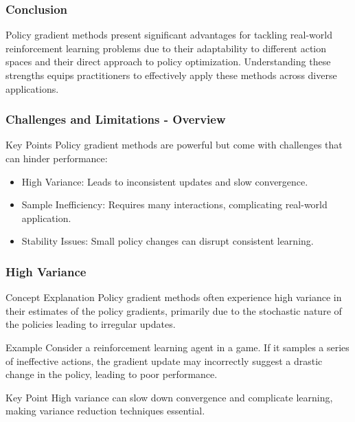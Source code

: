 \documentclass[aspectratio=169]{beamer}
\begin{document}
\begin{frame}[fragile]
    \frametitle{Conclusion}
    Policy gradient methods present significant advantages for tackling real-world reinforcement learning problems due to their adaptability to different action spaces and their direct approach to policy optimization. Understanding these strengths equips practitioners to effectively apply these methods across diverse applications.
\end{frame}

\begin{frame}[fragile]
    \frametitle{Challenges and Limitations - Overview}
    \begin{block}{Key Points}
        Policy gradient methods are powerful but come with challenges that can hinder performance:
        \begin{itemize}
            \item High Variance: Leads to inconsistent updates and slow convergence.
            \item Sample Inefficiency: Requires many interactions, complicating real-world application.
            \item Stability Issues: Small policy changes can disrupt consistent learning.
        \end{itemize}
    \end{block}
\end{frame}

\begin{frame}[fragile]
    \frametitle{High Variance}
    \begin{block}{Concept Explanation}
        Policy gradient methods often experience high variance in their estimates of the policy gradients, primarily due to the stochastic nature of the policies leading to irregular updates.
    \end{block}

    \begin{block}{Example}
        Consider a reinforcement learning agent in a game. If it samples a series of ineffective actions, the gradient update may incorrectly suggest a drastic change in the policy, leading to poor performance.
    \end{block}

    \begin{block}{Key Point}
        High variance can slow down convergence and complicate learning, making variance reduction techniques essential.
    \end{block}
\end{frame}
\end{document}
